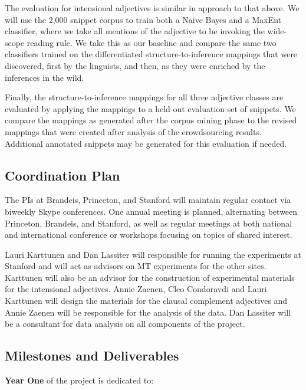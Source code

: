 \documentclass[10pt]{article}
\begin{document}
The evaluation for intensional adjectives is similar in approach to that above. We will use the 2,000 snippet corpus  to train both a Naive Bayes and a MaxEnt classifier, where we take all mentions of the adjective to be invoking the   wide-scope reading rule. We take this as our baseline and compare the same two classifiers trained on the differentiated structure-to-inference mappings that were discovered, first by the linguists, and then, as they were enriched by the inferences in the wild. 


Finally, the structure-to-inference mappings for all three adjective classes are evaluated by applying the mappings to a held out evaluation set of snippets. We compare the mappings as generated after the corpus mining phase to the revised mappings that were created after analysis of the crowdsourcing results. Additional annotated snippets may be generated for this evaluation if needed. 

\vspace {-2mm}
\vspace {-2mm}
\subsection{Coordination Plan}
\vspace {-2mm}

The PIs at Brandeis, Princeton, and Stanford will maintain regular contact via biweekly Skype conferences. One annual meeting is planned, alternating between Princeton, Brandeis, and Stanford, as well as regular meetings at both national and international conference or workshops focusing on topics of shared interest. 

Lauri Karttunen and Dan Lassiter will responsible for running the experiments at Stanford and will act as advisors on MT experiments for the other sites.  Karttunen will also be an advisor for the construction of experimental materials for the intensional adjectives. Annie Zaenen, Cleo Condoravdi and Lauri Karttunen will design the materials for the clausal complement adjectives and Annie Zaenen will be responsible for the analysis of the data. Dan Lassiter will be a consultant for data analysis on all components of the project. 


\vspace {-2mm}
\vspace {-2mm}

\subsection{Milestones and Deliverables}
\vspace {-1mm}

 
{\bf Year One} of the project is dedicated to: 
\end{document}
